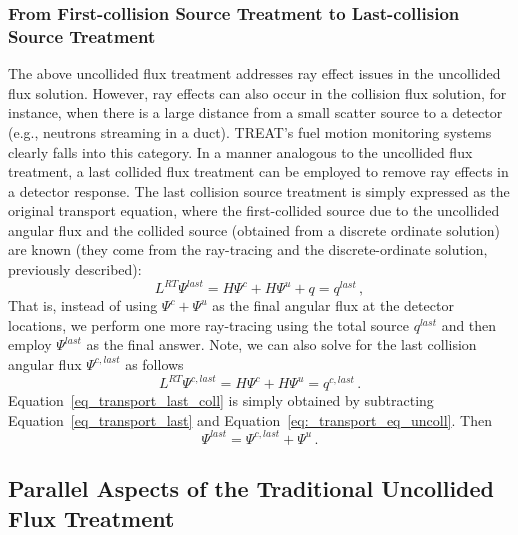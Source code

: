 \documentclass[12pt]{scrartcl}
\newcommand{\eqt}[1]{Equation~\ref{#1}}                     %
\begin{document}
\subsubsection{From First-collision Source Treatment to Last-collision Source Treatment}


The above uncollided flux treatment addresses ray effect issues in the uncollided flux solution. However, ray effects can also occur in the collision flux solution, for instance, when there is a large distance from a small scatter source to a detector (e.g., neutrons streaming in a duct). TREAT's fuel motion monitoring systems clearly falls into this category. In a manner analogous to the uncollided flux treatment, a last collided flux treatment can be employed to remove ray effects in a detector response. The last collision source treatment is simply expressed as the original transport equation, where the first-collided source due to the uncollided angular flux and the collided source (obtained from a discrete ordinate solution) 
are known (they come from the ray-tracing and the discrete-ordinate solution, previously described):
\begin{equation}
\label{eq_transport_last}
L^{RT}\Psi^{last} = H\Psi^c + H\Psi^u + q = q^{last}\,,
\end{equation}
That is, instead of using $\Psi^c + \Psi^u$ as the final angular flux at the detector locations, we perform one
more ray-tracing using the total source $q^{last}$ and then employ $\Psi^{last}$ as the final answer.
Note, we can also solve for the last collision angular flux $\Psi^{c,last}$ as follows
\begin{equation}
\label{eq_transport_last_coll}
L^{RT}\Psi^{c,last} = H\Psi^c + H\Psi^u  = q^{c,last}\,.
\end{equation}
\eqt{eq_transport_last_coll} is simply obtained by subtracting \eqt{eq_transport_last} and \eqt{eq:_transport_eq_uncoll}. Then
\[
\Psi^{last} = \Psi^{c,last}  + \Psi^u \,.
\]

\subsection{Parallel Aspects of the Traditional Uncollided Flux Treatment}
\end{document}
